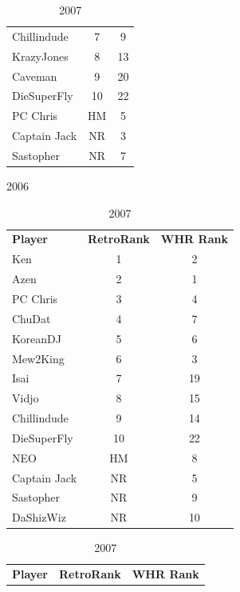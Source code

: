 \documentclass[10pt]{article}
\theoremstyle{definition}
\theoremstyle{remark}
\begin{document}
\begin{table}[!ht]
{\begin{tabular}{lcc}
    Chillindude     & 7                      & 9        \\
    KrazyJones      & 8                      & 13       \\
    Caveman         & 9                      & 20       \\
    DieSuperFly     & 10                     & 22       \\
    PC Chris        & HM                     & 5        \\
    Captain Jack    & NR                     & 3        \\
    Sastopher       & NR                     & 7        \\
\end{tabular}
}
    \parbox{.33 \textwidth}{
        \centering
        \caption{2006}
\begin{tabular}{lcc}
    \textbf{Player} & \textbf{RetroRank} & \textbf{WHR Rank} \\
    Ken             & 1                      & 2        \\
    Azen            & 2                      & 1        \\
    PC Chris        & 3                      & 4        \\
    ChuDat          & 4                      & 7        \\
    KoreanDJ        & 5                      & 6        \\
    Mew2King        & 6                      & 3        \\
    Isai            & 7                      & 19       \\
    Vidjo           & 8                      & 15       \\
    Chillindude     & 9                      & 14       \\
    DieSuperFly     & 10                     & 22       \\
    NEO             & HM                     & 8        \\
    Captain Jack    & NR                     & 5        \\
    Sastopher       & NR                     & 9        \\
    DaShizWiz       & NR                     & 10       \\
\end{tabular}
}
    \parbox{.33 \textwidth}{
        \centering
        \caption{2007}
\begin{tabular}{lcc}
    \textbf{Player} & \textbf{RetroRank} & \textbf{WHR Rank} \\

\end{tabular}}
\end{table}
\end{document}
